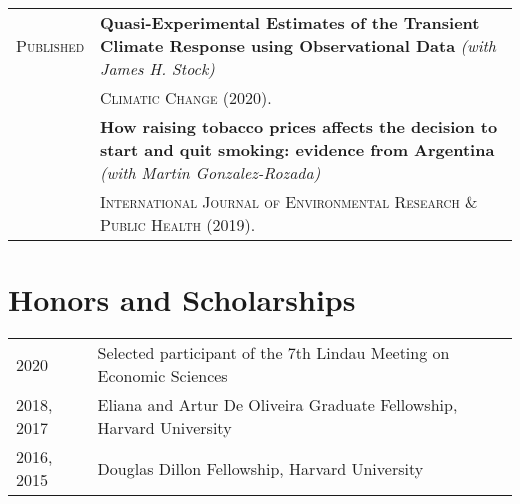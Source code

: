 \documentclass[letterpaper,9pt]{article} %
\begin{document}
\begin{tabular}{>{\raggedleft\arraybackslash}p{}|p{}}
	\textsc{Published} & \textbf{Quasi-Experimental Estimates of the Transient Climate Response using Observational Data} \emph{(with James H. Stock)} \\
	& \textsc{Climatic Change (2020).}\\
	& \textbf{How raising tobacco prices
		affects the decision to start and quit smoking: evidence from Argentina}   \emph{(with Martin Gonzalez-Rozada)} \\
	& \textsc{International
		Journal of Environmental Research \& Public Health (2019).} 
\end{tabular}

	


\section{Honors and Scholarships}
\begin{tabular}{>{\raggedleft\arraybackslash}p{}|p{}}
	\textsc{2020} & Selected participant of the 7th Lindau Meeting on Economic Sciences \\
	
	\textsc{2018, 2017} & Eliana and Artur De Oliveira Graduate Fellowship, Harvard University \\
	
	\textsc{2016, 2015} & Douglas Dillon Fellowship, Harvard University \\
	
\end{tabular}
\end{document}
